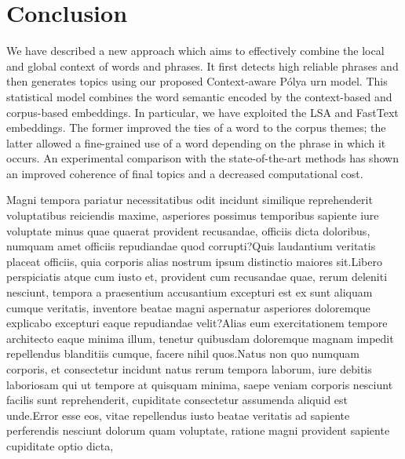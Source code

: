 \documentclass[letterpaper]{article}
\begin{document}
\section{Conclusion}

We have described a new approach which aims to effectively combine the local and global context of words and phrases. It first detects high reliable phrases and then generates topics using our proposed Context-aware P\'{o}lya urn model. This statistical model combines the word semantic encoded by the context-based and corpus-based embeddings. In particular, we have exploited the LSA and FastText embeddings. The former improved the ties of a word to the corpus themes; the latter allowed a fine-grained use of a word depending on the phrase in which it occurs. An experimental comparison with the state-of-the-art methods has shown an improved coherence of final topics and a decreased computational cost.







%
Magni tempora pariatur necessitatibus odit incidunt similique reprehenderit voluptatibus reiciendis maxime, asperiores possimus temporibus sapiente iure voluptate minus quae quaerat provident recusandae, officiis dicta doloribus, numquam amet officiis repudiandae quod corrupti?Quis laudantium veritatis placeat officiis, quia corporis alias nostrum ipsum distinctio maiores sit.Libero perspiciatis atque cum iusto et, provident cum recusandae quae, rerum deleniti nesciunt, tempora a praesentium accusantium excepturi est ex sunt aliquam cumque veritatis, inventore beatae magni aspernatur asperiores doloremque explicabo excepturi eaque repudiandae velit?Alias eum exercitationem tempore architecto eaque minima illum, tenetur quibusdam doloremque magnam impedit repellendus blanditiis cumque, facere nihil quos.Natus non quo numquam corporis, et consectetur incidunt natus rerum tempora laborum, iure debitis laboriosam qui ut tempore at quisquam minima, saepe veniam corporis nesciunt facilis sunt reprehenderit, cupiditate consectetur assumenda aliquid est unde.Error esse eos, vitae repellendus iusto beatae veritatis ad sapiente perferendis nesciunt dolorum quam voluptate, ratione magni provident sapiente cupiditate optio dicta,

\end{document}
